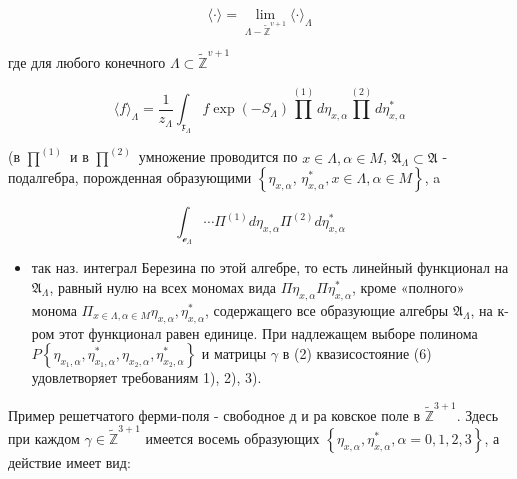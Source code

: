 \documentclass[10pt]{article}
\begin{document}
\[

\langle\cdot\rangle=\lim _{\Lambda-\tilde{\mathbb{Z}}^{v+1}}\langle\cdot\rangle_{\Lambda}

\]



где для любого конечного $\Lambda \subset \widetilde{\mathbb{Z}}^{v+1}$



\[

\langle f\rangle_{\Lambda}=\frac{1}{z_{\Lambda}} \int_{\mathfrak{x}_{\Lambda}} f \exp \left(-S_{\Lambda}\right) \prod^{(1)} d \eta_{x, \alpha} \prod^{(2)} d \eta_{x, \alpha}^{*}

\]



(в $\prod^{(1)}$ и в $\prod^{(2)}$ умножение проводится по $x \in \Lambda, \alpha \in M$, $\mathfrak{A}_{\Lambda} \subset \mathfrak{A}$ - подалгебра, порожденная образующими $\left\{\eta_{x, \alpha}\right.$, $\left.\eta_{x, \alpha}^{*}, x \in \Lambda, \alpha \in M\right\}$, a



\[

\int_{\mathscr{e}_{\Lambda}} \cdots \Pi^{(1)} d \eta_{x, \alpha} \Pi^{(2)} d \eta_{x, \alpha}^{*}

\]



\begin{itemize}

  \item так наз. интеграл Березина по этой алгебре, то есть линейный функционал на $\mathfrak{A}_{\Lambda}$, равный нулю на всех мономах вида $\Pi \eta_{x, \alpha} \Pi \eta_{x, \alpha}^{*}$, кроме «полного» монома $\Pi_{x \in \Lambda, \alpha \in M} \eta_{x, \alpha}, \eta_{x, \alpha}^{*}$, содержащего все образующие алгебры $\mathfrak{A}_{\Lambda}$, на к-ром этот функционал равен единице. При надлежащем выборе полинома $P\left\{\eta_{x_{1}, \alpha}, \eta_{x_{1}, \alpha}^{*}, \eta_{x_{2}, \alpha}, \eta_{x_{2}, \alpha}^{*}\right\}$ и матрицы $\gamma$ в (2) квазисостояние (6) удовлетворяет требованиям 1), 2), 3).

\end{itemize}



Пример решетчатого ферми-поля - свободное д и ра ковское поле в $\widetilde{\mathbb{Z}}^{3+1}$. Здесь при каждом $\gamma \in \widetilde{\mathbb{Z}}^{3+1}$ имеется восемь образующих $\left\{\eta_{x, \alpha}, \eta_{x, \alpha}^{*}, \alpha=0,1,2,3\right\}$, а действие имеет вид:
\end{document}
